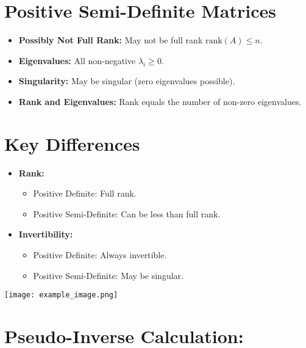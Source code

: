 \documentclass{article}
\begin{document}
\section*{Positive Semi-Definite Matrices}
\begin{itemize}[leftmargin=*]
    \item \textbf{Possibly Not Full Rank:} May not be full rank \(\text{rank}(A) \leq n\).
    \item \textbf{Eigenvalues:} All non-negative \(\lambda_i \geq 0\).
    \item \textbf{Singularity:} May be singular (zero eigenvalues possible).
    \item \textbf{Rank and Eigenvalues:} Rank equals the number of non-zero eigenvalues.
\end{itemize}

\section*{Key Differences}
\begin{itemize}[leftmargin=*]
    \item \textbf{Rank:}
    \begin{itemize}[leftmargin=*]
        \item Positive Definite: Full rank.
        \item Positive Semi-Definite: Can be less than full rank.
    \end{itemize}
    
    \item \textbf{Invertibility:}
    \begin{itemize}[leftmargin=*]
        \item Positive Definite: Always invertible.
        \item Positive Semi-Definite: May be singular.
    \end{itemize}
\end{itemize}

\begin{center}
    \texttt{[image: example\_image.png]}
\end{center}




\section*{Pseudo-Inverse Calculation:}
\end{document}
